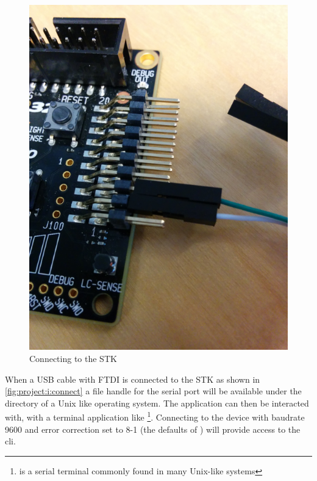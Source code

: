 \begin{figure}[H]
  \begin{center}
    \includegraphics[scale=0.5]{figures/project-i-connect.png}
  \end{center}
  \caption{Connecting to the STK}
  \label{fig:project:i:connect}
\end{figure}

When a USB cable with FTDI is connected to the STK as shown in \autoref{fig:project:i:connect} a file handle for the serial port will be available under the  directory of a Unix like operating system.
The application can then be interacted with, with a terminal application like \footnote{ is a serial terminal commonly found in many Unix-like systems}.
Connecting to the device with baudrate 9600 and error correction set to 8-1 (the defaults of ) will provide access to the {\tracker} \gls{cli}.

